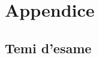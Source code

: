 \documentclass[a4paper]{article}
\begin{document}
	

	\newpage
	\newpage
	\newpage
	\section{Appendice}

	\subsection{Temi d'esame}
\end{document}
